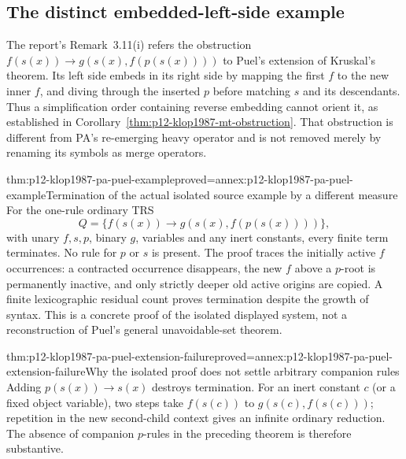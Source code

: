 \subsection{The distinct embedded-left-side example}

The report's Remark~3.11(i) refers the obstruction
\(f(s(x))\to g(s(x),f(p(s(x))))\) to Puel's extension of
Kruskal's theorem. Its left side embeds in its right side by mapping
the first \(f\) to the new inner \(f\), and diving through
the inserted \(p\) before matching \(s\) and its descendants.
Thus a simplification order containing reverse embedding cannot
orient it, as established in
Corollary~\ref{thm:p12-klop1987-mt-obstruction}. That obstruction
is different from PA's re-emerging heavy operator and is not removed
merely by renaming its symbols as merge operators.

\begin{hbtheorem}{thm:p12-klop1987-pa-puel-example}{proved=annex:p12-klop1987-pa-puel-example}{Termination of the actual isolated source example by a different measure}
For the one-rule ordinary TRS
\[
 Q=\{f(s(x))\to g(s(x),f(p(s(x))))\},
\]
with unary \(f,s,p\), binary \(g\), variables and any inert
constants, every finite term terminates. No rule for \(p\) or
\(s\) is present. The proof traces the initially active \(f\)
occurrences: a contracted occurrence disappears, the new \(f\)
above a \(p\)-root is permanently inactive, and only strictly
deeper old active origins are copied. A finite lexicographic residual
count proves termination despite the growth of syntax.
This is a concrete proof of the isolated displayed system, not a
reconstruction of Puel's general unavoidable-set theorem.
\end{hbtheorem}

\begin{hblemma}{thm:p12-klop1987-pa-puel-extension-failure}{proved=annex:p12-klop1987-pa-puel-extension-failure}{Why the isolated proof does not settle arbitrary companion rules}
Adding \(p(s(x))\to s(x)\) destroys termination. For an inert
constant \(c\) (or a fixed object variable), two steps take \(f(s(c))\) to
\(g(s(c),f(s(c)))\); repetition in the new second-child context
gives an infinite ordinary reduction. The absence of companion
\(p\)-rules in the preceding theorem is therefore substantive.
\end{hblemma}

